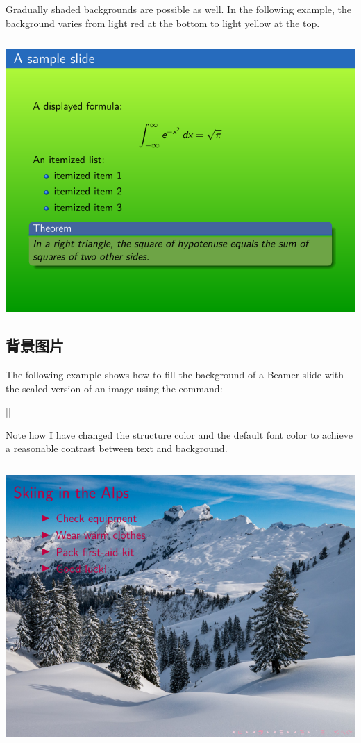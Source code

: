 \begin{column}{0.5\textwidth}
Gradually shaded backgrounds are possible as well. In the following example, the background varies from light red at the bottom to light yellow at the top.

\inputminted[linenos=true]{latex}{examples/beamer/theme-background-color-shading.tex}

\includegraphics{examples/beamer/theme-background-color-shading.pdf}

\subsection{背景图片}

The following example shows how to fill the background of a Beamer slide with the scaled version of an image using the command:

||

Note how I have changed the structure color and the default font color to achieve a reasonable contrast between text and background.

\inputminted[linenos=true]{latex}{examples/beamer/theme-background-figure.tex}

\includegraphics{examples/beamer/theme-background-figure.pdf}


\end{column}
